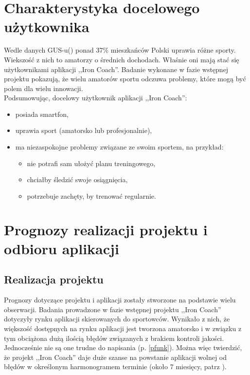 \section{Charakterystyka docelowego użytkownika}
\noindent Wedle danych GUS-u(\cite{Gu}) ponad 37\% mieszkańców Polski uprawia różne sporty. Wiekszość z nich to amatorzy o średnich dochodach. Właśnie oni mają stać się użytkownikami aplikacji ,,Iron Coach''. Badanie wykonane w fazie wstępnej projektu \cite{Ba} pokazują, że wielu amatorów sportu odczuwa problemy, które mogą być polem dla wielu innowacji.
\\Podsumowując, docelowy użytkownik aplikacji ,,Iron Coach'':
\begin{itemize}
  \item posiada smartfon,
  \item uprawia sport (amatorsko lub profesjonalnie),
  \item ma niezaspokojne problemy związane ze swoim sportem, na przykład:
    \begin{itemize}
      \item nie potrafi sam ułożyć planu treningowego,
      \item chciałby śledzić swoje osiągnięcia,
      \item potrzebuje zachęty, by trenować regularnie.
    \end{itemize}
\end{itemize}
\section{Prognozy realizacji projektu i odbioru aplikacji}
\subsection{Realizacja projektu}
\noindent Prognozy dotyczące projektu i aplikacji zostały stworzone na podstawie wielu obserwacji. Badania prowadzone w fazie wstępnej projektu ,,Iron Coach'' \cite{Ba} dotyczyły rynku aplikacji skierowanych do sportowców. Wynikało z nich, że większość dostępnych na rynku aplikacji jest tworzona amatorsko i w związku z tym obciążona dużą ilością błędów związanych z brakiem kontroli jakości. Jednocześnie nie są one trudne do napisania (p. \ref{pfunk}). Można więc twierdzić, że projekt ,,Iron Coach'' daje duże szanse na powstanie aplikacji wolnej od błędów w określonym harmonogramem terminie (około 7 miesięcy, patrz \cite{Ha}). 
